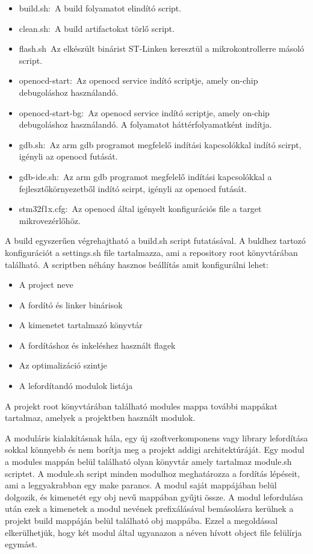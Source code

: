 \begin{itemize}
\item{build.sh:~A build folyamatot elindító script.}
\item{clean.sh:~A build artifactokat törlő script.}
\item{flash.sh~Az elkészült binárist ST-Linken keresztül a mikrokontrollerre
  másoló script.}
\item{openocd-start:~Az openocd service indító scriptje, amely on-chip
  debugoláshoz használandó.}
\item{openocd-start-bg:~Az openocd service indító scriptje, amely on-chip
  debugoláshoz használandó. A folyamatot háttérfolyamatként indítja.}
\item{gdb.sh:~Az arm gdb programot megfelelő indítási kapcsolókkal indító scirpt,
  igényli az openocd futását.}
\item{gdb-ide.sh:~Az arm gdb programot megfelelő indítási kapcsolókkal a
  fejlesztőkörnyezetből indító scirpt, igényli az openocd futását.}
\item{stm32f1x.cfg:~Az openocd által igényelt konfigurációs file a target
  mikrovezérlőhöz.}
\end{itemize}

A build egyszerűen végrehajtható a build.sh script futatásával. A buldhez tartozó
konfigurációt a settings.sh file tartalmazza, ami a repository root könyvtárában
található. A scriptben néhány hasznos beállítás amit konfigurálni lehet:

\begin{itemize}
\item{A project neve}
\item{A fordító és linker binárisok}
\item{A kimenetet tartalmazó könyvtár}
\item{A fordításhoz és inkeléshez használt flagek}
\item{Az optimalizáció szintje}
\item{A lefordítandó modulok listája}
\end{itemize}

A projekt root könyvtárában található modules mappa további mappákat tartalmaz,
amelyek a projektben használt modulok.

A moduláris kialakításnak hála, egy új szoftverkomponens vagy library lefordítása
sokkal könnyebb és nem borítja meg a projekt addigi architektúráját. Egy modul a
modules mappán belül található olyan könyvtár amely tartalmaz module.sh scriptet.
A module.sh script minden modulhoz meghatározza a fordítás lépéseit, ami a
leggyakrabban egy make parancs. A modul saját mappájában belül dolgozik, és
kimenetét egy obj nevű mappában gyűjti össze. A modul lefordulása után ezek a
kimenetek a modul nevének prefixálásával bemásolásra kerülnek a projekt build
mappáján belül található obj mappába. Ezzel a megoldással elkerülhetjük, hogy két
modul által ugyanazon a néven hívott object file felülírja egymást.

